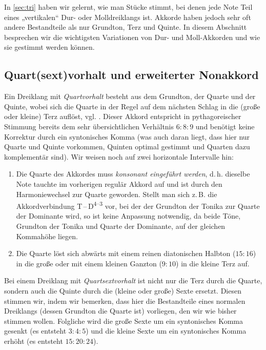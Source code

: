 In \cref{sec:tri} haben wir gelernt, wie man Stücke stimmt, bei denen jede Note
Teil eines „vertikalen“ Dur- oder Molldreiklangs ist. Akkorde haben jedoch sehr
oft andere Bestandteile als nur Grundton, Terz und Quinte. In diesem Abschnitt
besprechen wir die wichtigsten Variationen von Dur- und Moll-Akkorden und wie
sie gestimmt werden können.

\subsection{Quart(sext)vorhalt und erweiterter Nonakkord}
\label{sec:49}

Ein Dreiklang mit \emph{Quartvorhalt} besteht aus dem Grundton, der Quarte und
der Quinte, wobei sich die Quarte in der Regel auf dem nächsten Schlag in die
(große oder kleine) Terz auflöst, vgl. \cite[{}8.2]{Skript}. Dieser Akkord
entspricht in pythagoreischer Stimmung bereits dem sehr übersichtlichen
Verhältnis $6:8:9$ und benötigt keine Korrektur durch ein syntonisches Komma
(was auch daran liegt, dass hier nur Quarte und Quinte vorkommen, Quinten
optimal gestimmt und Quarten dazu komplementär sind).  Wir weisen noch auf zwei
horizontale Intervalle hin:
\begin{enumerate}
\item Die Quarte des Akkordes muss \emph{konsonant eingeführt werden},
  d.\,h. dieselbe Note tauchte im vorherigen regulär Akkord auf und ist durch
  den Harmoniewechsel zur Quarte geworden. Stellt man sich z.\,B. die
  Akkordverbindung T\,–\,D\textsuperscript{$4$–$3$} vor, bei der der Grundton
  der Tonika zur Quarte der Dominante wird, so ist keine Anpassung notwendig, da
  beide Töne, Grundton der Tonika und Quarte der Dominante, auf der gleichen
  Kommahöhe liegen.
\item Die Quarte löst sich abwärts mit einem reinen diatonischen Halbton
  ($15:16$) in die große oder mit einem kleinen Ganzton ($9:10$) in die
  kleine Terz auf.
\end{enumerate}
Bei einem Dreiklang mit \emph{Quartsextvorhalt} ist nicht nur die Terz durch die
Quarte, sondern auch die Quinte durch die (kleine oder große) Sexte ersetzt.
Diesen stimmen wir, indem wir bemerken, dass hier die Bestandteile eines
normalen Dreiklangs (dessen Grundton die Quarte ist) vorliegen, den wir wie
bisher stimmen wollen. Folgliche wird die große Sexte um ein syntonisches Komma
gesenkt (es entsteht $3:4:5$) und die kleine Sexte um ein syntonisches Komma
erhöht (es entsteht $15:20:24$).

